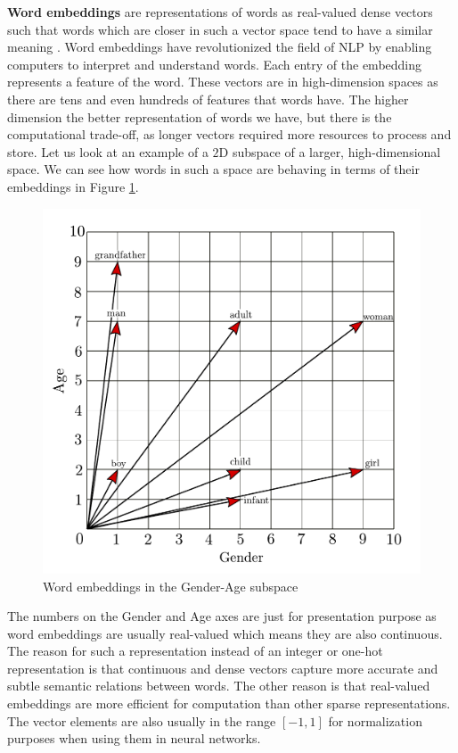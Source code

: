 \documentclass[12pt]{article}
\numberwithin{equation}{section}
\begin{document}
\begin{spacing}{1.5}
	\textbf{Word embeddings} are representations of words as real-valued dense vectors such that words which are closer in such a vector space tend to have a similar meaning \cite{word-embedding-survey}. Word embeddings have revolutionized the field of NLP by enabling computers to interpret and understand words. Each entry of the embedding represents a feature of the word. These vectors are in high-dimension spaces as there are tens and even hundreds of features that words have. The higher dimension the better representation of words we have, but there is the computational trade-off, as longer vectors required more resources to process and store. Let us look at an example of a $2$D subspace of a larger, high-dimensional space. We can see how words in such a space are behaving in terms of their embeddings in Figure \ref{subspace_label}.
	\begin{figure}[H]
		\centering
		\hspace*{-1.0cm}
		\includegraphics[scale=0.75]{subspace}		
		\caption{Word embeddings in the Gender-Age subspace}
		\label{subspace_label}
	\end{figure}
	
	The numbers on the Gender and Age axes are just for presentation purpose as word embeddings are usually real-valued which means they are also continuous. The reason for such a representation instead of an integer or one-hot representation is that continuous and dense vectors capture more accurate and subtle semantic relations between words. The other reason is that real-valued embeddings are more efficient for computation than other sparse representations. The vector elements are also usually in the range $[-1, 1]$ for normalization purposes when using them in neural networks. \\
	

\end{spacing}
\end{document}

